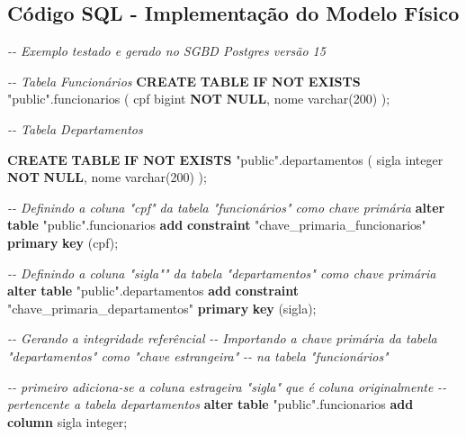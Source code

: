 \documentclass[
]{book}
\newenvironment{Shaded}{\begin{snugshade}}{\end{snugshade}}
\newcommand{\CommentTok}[1]{\textcolor[rgb]{0.56,0.35,0.01}{\textit{#1}}}
\newcommand{\ControlFlowTok}[1]{\textcolor[rgb]{0.13,0.29,0.53}{\textbf{#1}}}
\newcommand{\DataTypeTok}[1]{\textcolor[rgb]{0.13,0.29,0.53}{#1}}
\newcommand{\DecValTok}[1]{\textcolor[rgb]{0.00,0.00,0.81}{#1}}
\newcommand{\KeywordTok}[1]{\textcolor[rgb]{0.13,0.29,0.53}{\textbf{#1}}}
\newcommand{\NormalTok}[1]{#1}
\newcommand{\OtherTok}[1]{\textcolor[rgb]{0.56,0.35,0.01}{#1}}
\begin{document}
\subsection{Código SQL - Implementação do Modelo Físico}\label{cuxf3digo-sql---implementauxe7uxe3o-do-modelo-fuxedsico}

\begin{Shaded}
\begin{Highlighting}[]
\CommentTok{{-}{-} Exemplo testado e gerado no SGBD Postgres versão 15}

\CommentTok{{-}{-} Tabela Funcionários}
\KeywordTok{CREATE} \KeywordTok{TABLE} \ControlFlowTok{IF} \KeywordTok{NOT} \KeywordTok{EXISTS} \OtherTok{"public"}\NormalTok{.funcionarios}
\NormalTok{(}
\NormalTok{    cpf bigint }\KeywordTok{NOT} \KeywordTok{NULL}\NormalTok{,}
\NormalTok{    nome }\DataTypeTok{varchar}\NormalTok{(}\DecValTok{200}\NormalTok{)}
\NormalTok{);}

\CommentTok{{-}{-} Tabela Departamentos}

\KeywordTok{CREATE} \KeywordTok{TABLE} \ControlFlowTok{IF} \KeywordTok{NOT} \KeywordTok{EXISTS} \OtherTok{"public"}\NormalTok{.departamentos}
\NormalTok{(}
\NormalTok{    sigla }\DataTypeTok{integer} \KeywordTok{NOT} \KeywordTok{NULL}\NormalTok{,}
\NormalTok{    nome }\DataTypeTok{varchar}\NormalTok{(}\DecValTok{200}\NormalTok{)}
\NormalTok{);}

\CommentTok{{-}{-} Definindo a coluna "cpf" da tabela "funcionários" como chave primária}
\KeywordTok{alter} \KeywordTok{table} \OtherTok{"public"}\NormalTok{.funcionarios }\KeywordTok{add} \KeywordTok{constraint} \OtherTok{"chave\_primaria\_funcionarios"} \KeywordTok{primary} \KeywordTok{key}\NormalTok{ (cpf);}

\CommentTok{{-}{-} Definindo a coluna "sigla"" da tabela "departamentos" como chave primária}
\KeywordTok{alter} \KeywordTok{table} \OtherTok{"public"}\NormalTok{.departamentos }\KeywordTok{add} \KeywordTok{constraint} \OtherTok{"chave\_primaria\_departamentos"} \KeywordTok{primary} \KeywordTok{key}\NormalTok{ (sigla);}

\CommentTok{{-}{-} Gerando a integridade referêncial }
\CommentTok{{-}{-} Importando a chave primária da tabela "departamentos" como "chave estrangeira"}
\CommentTok{{-}{-} na tabela "funcionários"}

\CommentTok{{-}{-} primeiro adiciona{-}se a coluna estrageira "sigla" que é coluna originalmente }
\CommentTok{{-}{-} pertencente a tabela departamentos}
\KeywordTok{alter} \KeywordTok{table} \OtherTok{"public"}\NormalTok{.funcionarios }\KeywordTok{add} \KeywordTok{column}\NormalTok{ sigla }\DataTypeTok{integer}\NormalTok{;}


\end{Highlighting}
\end{Shaded}
\end{document}
